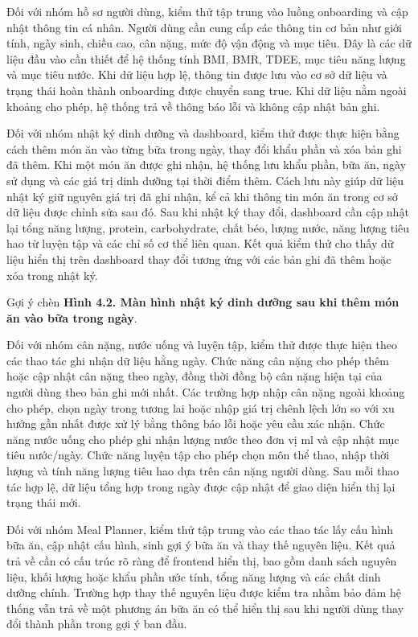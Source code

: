 Đối với nhóm hồ sơ người dùng, kiểm thử tập trung vào luồng onboarding và cập nhật thông tin cá nhân. Người dùng cần cung cấp các thông tin cơ bản như giới tính, ngày sinh, chiều cao, cân nặng, mức độ vận động và mục tiêu. Đây là các dữ liệu đầu vào cần thiết để hệ thống tính BMI, BMR, TDEE, mục tiêu năng lượng và mục tiêu nước. Khi dữ liệu hợp lệ, thông tin được lưu vào cơ sở dữ liệu và trạng thái hoàn thành onboarding được chuyển sang true. Khi dữ liệu nằm ngoài khoảng cho phép, hệ thống trả về thông báo lỗi và không cập nhật bản ghi.

Đối với nhóm nhật ký dinh dưỡng và dashboard, kiểm thử được thực hiện bằng cách thêm món ăn vào từng bữa trong ngày, thay đổi khẩu phần và xóa bản ghi đã thêm. Khi một món ăn được ghi nhận, hệ thống lưu khẩu phần, bữa ăn, ngày sử dụng và các giá trị dinh dưỡng tại thời điểm thêm. Cách lưu này giúp dữ liệu nhật ký giữ nguyên giá trị đã ghi nhận, kể cả khi thông tin món ăn trong cơ sở dữ liệu được chỉnh sửa sau đó. Sau khi nhật ký thay đổi, dashboard cần cập nhật lại tổng năng lượng, protein, carbohydrate, chất béo, lượng nước, năng lượng tiêu hao từ luyện tập và các chỉ số cơ thể liên quan. Kết quả kiểm thử cho thấy dữ liệu hiển thị trên dashboard thay đổi tương ứng với các bản ghi đã thêm hoặc xóa trong nhật ký.

Gợi ý chèn \textbf{Hình 4.2. Màn hình nhật ký dinh dưỡng sau khi thêm món ăn vào bữa trong ngày}.

Đối với nhóm cân nặng, nước uống và luyện tập, kiểm thử được thực hiện theo các thao tác ghi nhận dữ liệu hằng ngày. Chức năng cân nặng cho phép thêm hoặc cập nhật cân nặng theo ngày, đồng thời đồng bộ cân nặng hiện tại của người dùng theo bản ghi mới nhất. Các trường hợp nhập cân nặng ngoài khoảng cho phép, chọn ngày trong tương lai hoặc nhập giá trị chênh lệch lớn so với xu hướng gần nhất được xử lý bằng thông báo lỗi hoặc yêu cầu xác nhận. Chức năng nước uống cho phép ghi nhận lượng nước theo đơn vị ml và cập nhật mục tiêu nước/ngày. Chức năng luyện tập cho phép chọn môn thể thao, nhập thời lượng và tính năng lượng tiêu hao dựa trên cân nặng người dùng. Sau mỗi thao tác hợp lệ, dữ liệu tổng hợp trong ngày được cập nhật để giao diện hiển thị lại trạng thái mới.

Đối với nhóm Meal Planner, kiểm thử tập trung vào các thao tác lấy cấu hình bữa ăn, cập nhật cấu hình, sinh gợi ý bữa ăn và thay thế nguyên liệu. Kết quả trả về cần có cấu trúc rõ ràng để frontend hiển thị, bao gồm danh sách nguyên liệu, khối lượng hoặc khẩu phần ước tính, tổng năng lượng và các chất dinh dưỡng chính. Trường hợp thay thế nguyên liệu được kiểm tra nhằm bảo đảm hệ thống vẫn trả về một phương án bữa ăn có thể hiển thị sau khi người dùng thay đổi thành phần trong gợi ý ban đầu.

